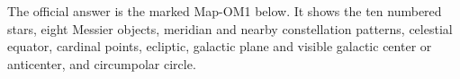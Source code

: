 The official answer is the marked Map-OM1 below. It shows the ten numbered stars, eight Messier objects, meridian and nearby constellation patterns, celestial equator, cardinal points, ecliptic, galactic plane and visible galactic center or anticenter, and circumpolar circle.
